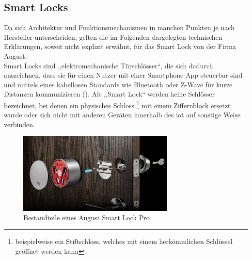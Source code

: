 \newpage
\subsection{Smart Locks}
\label{sec:sota_smart_locks}
	Da sich Architektur und Funktionsmechanismen in manchen Punkten je nach Hersteller unterscheiden, gelten die im Folgenden dargelegten technischen Erklärungen, soweit nicht explizit erwähnt, für das Smart Lock von der Firma August. 
    \medskip\\
    \noindent Smart Locks sind ,,elektromechanische Türschlösser``, die sich dadurch auszeichnen, dass sie für einen Nutzer mit einer Smartphone-App steuerbar sind und mittels eines kabellosen Standards wie Bluetooth oder Z-Wave für kurze Distanzen kommunizieren ().
	Als ,,Smart Lock`` werden keine Schlösser bezeichnet, bei denen ein physisches Schloss
	\footnote{beispielweise ein Stiftschloss, welches mit einem herkömmlichen Schlüssel geöffnet werden kann} 
	mit einem Ziffernblock ersetzt wurde oder sich nicht mit anderen Geräten innerhalb des \gls{iot} auf sonstige Weise verbinden.\cite{Ho2016}
	
	\begin{figure}[H]
		\centering
		\includegraphics[width=0.7\textwidth]{graphics/august_2.jpg}
		\caption[Bestandteile eines August Smart Lock Pro]{Bestandteile eines August Smart Lock Pro\cite{August}}
		\label{fig:august1}
	\end{figure}
	
